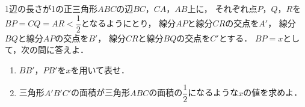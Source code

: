 \documentclass[../../main.tex]{subfiles}
\begin{document}
1辺の長さが1の正三角形$ABC$の辺$BC$，$CA$，$AB$上に，
それぞれ点$P$，$Q$，$R$を$\displaystyle BP=CQ=AR<\dfrac{1}{2}$となるようにとり，
線分$AP$と線分$CR$の交点を$A'$，
線分$BQ$と線分$AP$の交点を$B'$，
線分$CR$と線分$BQ$の交点を$C'$とする．
$BP=x$として，次の問に答えよ．
\begin{enumerate}
  \item $BB'$，$PB'$を$x$を用いて表せ．
  \item 三角形$A'B'C'$の面積が三角形$ABC$の面積の$\displaystyle\dfrac{1}{2}$になるような$x$の値を求めよ．
\end{enumerate}
\end{document}

